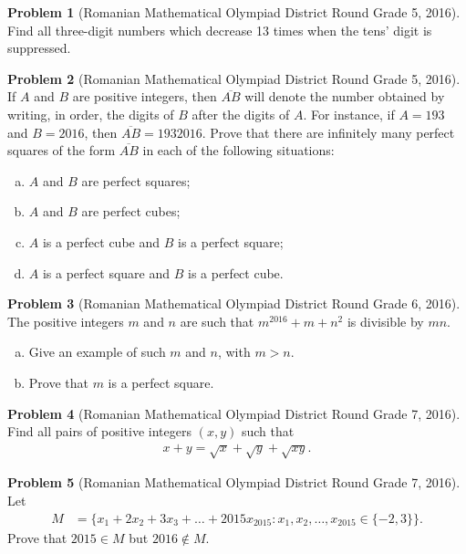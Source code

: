 \documentclass[]{article}
\theoremstyle{definition}
\newtheorem{problem}{Problem}
\begin{document}
\begin{problem}[Romanian Mathematical Olympiad District Round Grade 5, 2016]
	Find all three-digit numbers which decrease 13 times when the tens'	digit is suppressed.
\end{problem}


\begin{problem}[Romanian Mathematical Olympiad District Round Grade 5, 2016]
	If $A$ and $B$ are positive integers, then $\overline{AB}$ will denote the number obtained by writing, in order, the digits of $B$ after the digits of $A$. For instance, if $A = 193$ and $B = 2016$, then $\overline{AB} = 1932016$.
	Prove that there are infinitely many perfect squares of the form $\overline{AB}$ in each of the following situations:
		\begin{enumerate}[(a)]
			\item $A$ and $B$ are perfect squares;
			\item $A$ and $B$ are perfect cubes;
			\item $A$ is a perfect cube and $B$ is a perfect square;
			\item $A$ is a perfect square and $B$ is a perfect cube.
		\end{enumerate}
\end{problem}


\begin{problem}[Romanian Mathematical Olympiad District Round Grade 6, 2016]
	The positive integers $m$ and $n$ are such that $m^{2016}+m+n^2$ is divisible
	by $mn$.
		\begin{enumerate}[(a)]
			\item Give an example of such $m$ and $n$, with $m > n$.
			\item Prove that $m$ is a perfect square.
		\end{enumerate}
\end{problem}


\begin{problem}[Romanian Mathematical Olympiad District Round Grade 7, 2016]
	Find all pairs of positive integers $(x,y)$ such that
		\begin{align*}
			x + y = \sqrt x + \sqrt y + \sqrt{xy}.
		\end{align*}
\end{problem}



\begin{problem}[Romanian Mathematical Olympiad District Round Grade 7, 2016]
	Let
		\begin{align*}
			M &= \bigg\{x_1 + 2x_2 + 3x_3 + \dots + 2015x_{2015} : x_1, x_2, \dots, 	x_{2015} \in \{-2, 3\}\bigg\}.
		\end{align*}
	Prove that $2015 \in M$ but $2016 \not \in M$.
\end{problem}
\end{document}
